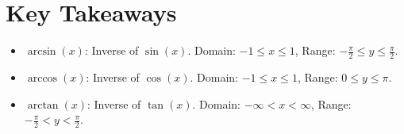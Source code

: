\documentclass{article}
\begin{document}
\section*{Key Takeaways}
\begin{definitionbox}
    \begin{itemize}
        \item $\arcsin(x)$: Inverse of $\sin(x)$. Domain: $-1 \leq x \leq 1$, Range: $-\frac{\pi}{2} \leq y \leq \frac{\pi}{2}$.
        \item $\arccos(x)$: Inverse of $\cos(x)$. Domain: $-1 \leq x \leq 1$, Range: $0 \leq y \leq \pi$.
        \item $\arctan(x)$: Inverse of $\tan(x)$. Domain: $-\infty < x < \infty$, Range: $-\frac{\pi}{2} < y < \frac{\pi}{2}$.
    \end{itemize}
\end{definitionbox}
\end{document}
